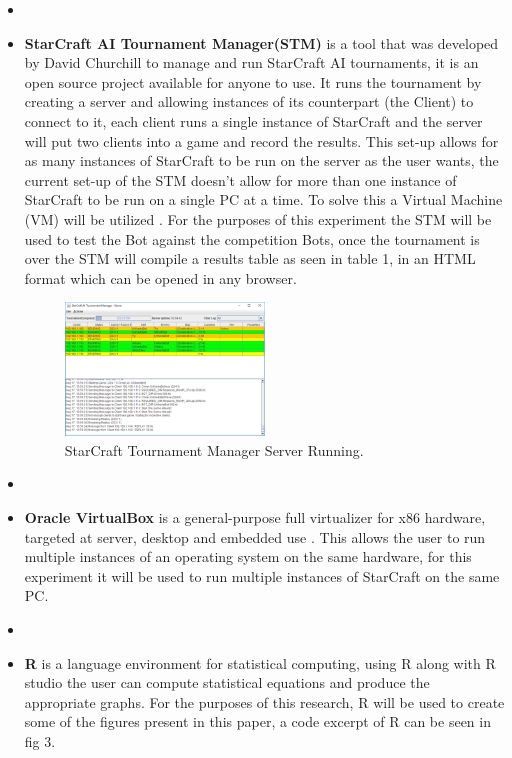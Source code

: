 \documentclass[journal]{IEEEtran}
\begin{document}
\begin{itemize}
		\item[]
		\item \textbf{StarCraft AI Tournament Manager(STM)} is a tool that was developed by David Churchill to manage and run StarCraft AI tournaments, it is an open source project available for anyone to use. It runs the tournament by creating a server and allowing instances of its counterpart (the Client) to connect to it, each client runs a single instance of StarCraft and the server will put two clients into a game and record the results. This set-up allows for as many instances of StarCraft to be run on the server as the user wants, the current set-up of the STM doesn't allow for more than one instance of StarCraft to be run on a single PC at a time. To solve this a Virtual Machine (VM) will be utilized \cite{Tournament}. For the purposes of this experiment the STM will be used to test the Bot against the competition Bots, once the tournament is over the STM will compile a results table as seen in table 1, in an HTML format which can be opened in any browser.
		\begin{figure}
			\centering
			\includegraphics[width=0.5\textwidth]{TMPic}
			\caption{StarCraft Tournament Manager Server Running.}
			\label{Fig2}
		\end{figure}
		\item[]
		\item \textbf{Oracle VirtualBox} is a general-purpose full virtualizer for x86 hardware, targeted at server, desktop and embedded use \cite{Virtual}. This allows the user to run multiple instances of an operating system on the same hardware, for this experiment it will be used to run multiple instances of StarCraft on the same PC. 
		\item[]
		\item \textbf{R} is a language environment for statistical computing, using R along with R studio the user can compute statistical equations and produce the appropriate graphs. For the purposes of this research, R will be used to create some of the figures present in this paper, a code excerpt of R can be seen in fig 3. 
		\newline
	\end{itemize}
	
\end{document}
